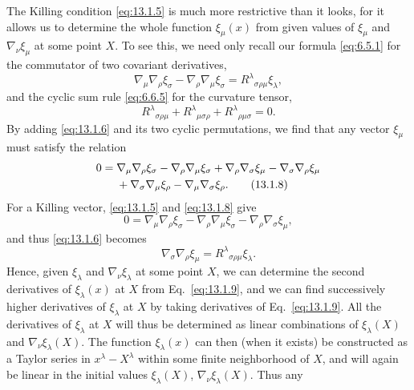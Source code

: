 The Killing condition \eqref{eq:13.1.5} is much more restrictive than it
looks, for it allows us to determine the whole function \(\xi_\mu(x)\) from
given values of \(\xi_\mu\) and \(\nabla_\nu\xi_\mu\) at some point \(X\).
To see this, we need only recall our formula \eqref{eq:6.5.1} for the
commutator of two covariant derivatives,
\begin{equation}
  \nabla_\mu\nabla_\rho\xi_\sigma
  -\nabla_\rho\nabla_\mu\xi_\sigma
  =
  R^\lambda{}_{\sigma\rho\mu}\xi_\lambda,
  \tag{13.1.6}\label{eq:13.1.6}
\end{equation}
and the cyclic sum rule \eqref{eq:6.6.5} for the curvature tensor,
\begin{equation}
  R^\lambda{}_{\sigma\rho\mu}
  +R^\lambda{}_{\mu\sigma\rho}
  +R^\lambda{}_{\rho\mu\sigma}
  =0.
  \tag{13.1.7}\label{eq:13.1.7}
\end{equation}
By adding \eqref{eq:13.1.6} and its two cyclic permutations, we find that
any vector \(\xi_\mu\) must satisfy the relation
\begin{align}
  0={}&
  \nabla_\mu\nabla_\rho\xi_\sigma
  -\nabla_\rho\nabla_\mu\xi_\sigma
  +\nabla_\rho\nabla_\sigma\xi_\mu
  -\nabla_\sigma\nabla_\rho\xi_\mu
  \notag\\
  &+\nabla_\sigma\nabla_\mu\xi_\rho
  -\nabla_\mu\nabla_\sigma\xi_\rho.
  \tag{13.1.8}\label{eq:13.1.8}
\end{align}
For a Killing vector, \eqref{eq:13.1.5} and \eqref{eq:13.1.8} give
\[
  0
  =
  \nabla_\mu\nabla_\rho\xi_\sigma
  -\nabla_\rho\nabla_\mu\xi_\sigma
  -\nabla_\rho\nabla_\sigma\xi_\mu,
\]
and thus \eqref{eq:13.1.6} becomes
\begin{equation}
  \nabla_\sigma\nabla_\rho\xi_\mu
  =
  R^\lambda{}_{\sigma\rho\mu}\xi_\lambda.
  \tag{13.1.9}\label{eq:13.1.9}
\end{equation}
Hence, given \(\xi_\lambda\) and \(\nabla_\nu\xi_\lambda\) at some point
\(X\), we can determine the second derivatives of \(\xi_\lambda(x)\) at
\(X\) from Eq.~\eqref{eq:13.1.9}, and we can find successively higher
derivatives of \(\xi_\lambda\) at \(X\) by taking derivatives of
Eq.~\eqref{eq:13.1.9}. All the derivatives of \(\xi_\lambda\) at \(X\)
will thus be determined as linear combinations of \(\xi_\lambda(X)\) and
\(\nabla_\nu\xi_\lambda(X)\). The function \(\xi_\lambda(x)\) can then
(when it exists) be constructed as a Taylor series in \(x^\lambda-X^\lambda\)
within some finite neighborhood of \(X\), and will again be linear in the
initial values \(\xi_\lambda(X)\), \(\nabla_\nu\xi_\lambda(X)\). Thus any
